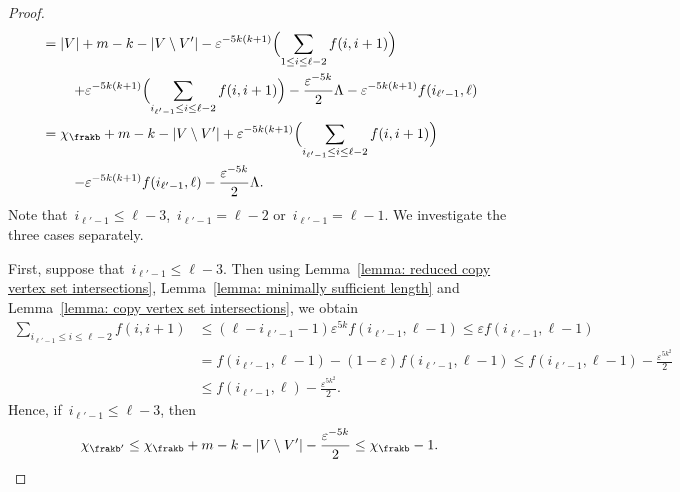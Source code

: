 \documentclass[11pt]{amsart}
\newcommand{\eps}{\varepsilon}
\DeclarePairedDelimiter{\paren}{\lparen}{\rparen}
\DeclarePairedDelimiter{\abs}{\lvert}{\rvert}
\theoremstyle{definition}
\numberwithin{equation}{section}
\begin{document}
\begin{proof}
\begin{align*}
			&= \abs{V}+m-k-\abs{V\setminus V'}-\eps^{-5k(k+1)}\paren[\Big]{\sum_{1\leq i\leq \ell-2} 
				f(i,i+1)}\\&\hphantom{=}\mathrel{}\quad+\eps^{-5k(k+1)}\paren[\Big]{\sum_{i_{\ell'-1}\leq i\leq \ell-2} f(i,i+1)}-\frac{\eps^{-5k}}{2}\Lambda-\eps^{-5k(k+1)}f(i_{\ell'-1},\ell)\\
			&=\chi_{\frakb}+m-k-\abs{V\setminus V'} +\eps^{-5k(k+1)}\paren[\Big]{\sum_{i_{\ell'-1}\leq i\leq \ell-2} f(i,i+1)}\\&\hphantom{=}\mathrel{}\quad-\eps^{-5k(k+1)}f(i_{\ell'-1},\ell)-\frac{\eps^{-5k}}{2}\Lambda.
		\end{align*}
		Note that~$i_{\ell'-1}\leq \ell-3$,~$i_{\ell'-1}= \ell-2$ or~$i_{\ell'-1}=\ell-1$.
		We investigate the three cases separately.
		
		First, suppose that~$i_{\ell'-1}\leq \ell-3$.
		Then using Lemma~\ref{lemma: reduced copy vertex set intersections}, Lemma~\ref{lemma: minimally sufficient length} and Lemma~\ref{lemma: copy vertex set intersections}, we obtain
		\begin{align*}
			\sum_{i_{\ell'-1}\leq i\leq \ell-2} f(i,i+1)
			&\leq (\ell-i_{\ell'-1}-1) \eps^{5k}f(i_{\ell'-1},\ell-1)
			\leq \eps f(i_{\ell'-1},\ell-1)\\
			&=f(i_{\ell'-1},\ell-1)-(1-\eps)f(i_{\ell'-1},\ell-1)
			\leq f(i_{\ell'-1},\ell-1)-\frac{\eps^{5k^2}}{2}\\
			&\leq f(i_{\ell'-1},\ell)-\frac{\eps^{5k^2}}{2}.
		\end{align*}
		Hence, if~$i_{\ell'-1}\leq \ell-3$, then
		\begin{equation*}
			\chi_{\frakb'}
			\leq\chi_{\frakb}+m-k-\abs{V\setminus V'} -\frac{\eps^{-5k}}{2}
			\leq \chi_{\frakb}-1.
		\end{equation*}
		

\end{proof}
\end{document}
